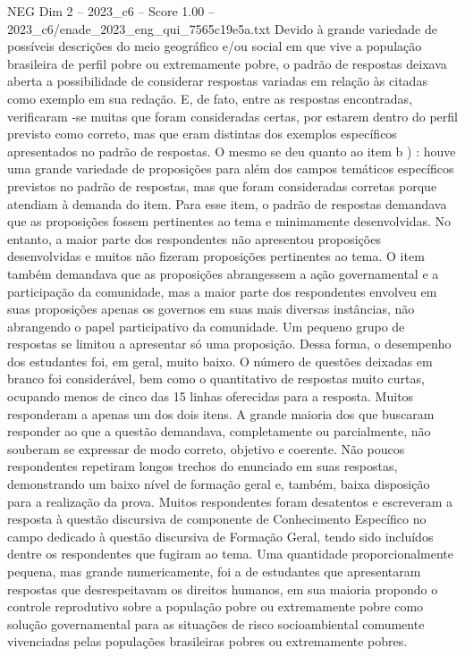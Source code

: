 \begin{textsample}{NEG Dim 2 – 2023\_c6 – Score 1.00 – 2023\_c6/enade\_2023\_eng\_qui\_7565c19e5a.txt}
Devido à grande variedade de possíveis descrições do meio geográfico e/ou social em que vive a população brasileira de perfil pobre ou extremamente pobre, o padrão de respostas deixava aberta a possibilidade de considerar respostas variadas em relação às citadas como exemplo em sua redação.
E, de fato, entre as respostas encontradas, verificaram -se muitas que foram consideradas certas, por estarem dentro do perfil previsto como correto, mas que eram distintas dos exemplos específicos apresentados no padrão de respostas.
O mesmo se deu quanto ao item b ) : houve uma grande variedade de proposições para além dos campos temáticos específicos previstos no padrão de respostas, mas que foram consideradas corretas porque atendiam à demanda do item.
Para esse item, o padrão de respostas demandava que as proposições fossem pertinentes ao tema e minimamente desenvolvidas.
No entanto, a maior parte dos respondentes não apresentou proposições desenvolvidas e muitos não fizeram proposições pertinentes ao tema.
O item também demandava que as proposições abrangessem a ação governamental e a participação da comunidade, mas a maior parte dos respondentes envolveu em suas proposições apenas os governos em suas mais diversas instâncias, não abrangendo o papel participativo da comunidade.
Um pequeno grupo de respostas se limitou a apresentar só uma proposição.
Dessa forma, o desempenho dos estudantes foi, em geral, muito baixo.
O número de questões deixadas em branco foi considerável, bem como o quantitativo de respostas muito curtas, ocupando menos de cinco das 15 linhas oferecidas para a resposta.
Muitos responderam a apenas um dos dois itens.
A grande maioria dos que buscaram responder ao que a questão demandava, completamente ou parcialmente, não souberam se expressar de modo correto, objetivo e coerente.
Não poucos respondentes repetiram longos trechos do enunciado em suas respostas, demonstrando um baixo nível de formação geral e, também, baixa disposição para a realização da prova.
Muitos respondentes foram desatentos e escreveram a resposta à questão discursiva de componente de Conhecimento Específico no campo dedicado à questão discursiva de Formação Geral, tendo sido incluídos dentre os respondentes que fugiram ao tema.
Uma quantidade proporcionalmente pequena, mas grande numericamente, foi a de estudantes que apresentaram respostas que desrespeitavam os direitos humanos, em sua maioria propondo o controle reprodutivo sobre a população pobre ou extremamente pobre como solução governamental para as situações de risco socioambiental comumente vivenciadas pelas populações brasileiras pobres ou extremamente pobres.

\end{textsample}
